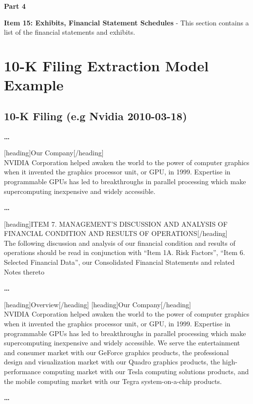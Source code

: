 \documentclass[logo,bsc,singlespacing,parskip]{infthesis}
\begin{document}
\textbf{Part 4} 

\textbf{Item 15: Exhibits, Financial Statement Schedules} - This section contains a list of the financial statements and exhibits.

\cite{sec2010k, wiki10k}
\chapter{10-K Filing Extraction Model Example}
\label{appendix_nvidia}

\section{10-K Filing (e.g Nvidia 2010-03-18)}
\label{appendix_nvidia_10-k}

\begin{center}
\textbf{…} \\
\end{center}
[heading]Our Company[/heading]\\
NVIDIA Corporation helped awaken the world to the power of computer graphics when it invented the graphics processor unit, or GPU, in 1999.  Expertise in programmable GPUs has led to breakthroughs in parallel processing which make supercomputing inexpensive and widely accessible.  
\begin{center}
\textbf{…} 
\end{center}
[heading]ITEM 7. MANAGEMENT’S DISCUSSION AND ANALYSIS OF FINANCIAL CONDITION AND RESULTS OF OPERATIONS[/heading]\\
The following discussion and analysis of our financial condition and results of operations should be read in conjunction with “Item 1A. Risk Factors”, “Item 6. Selected Financial Data”, our Consolidated Financial Statements and related Notes thereto 
\begin{center}
\textbf{…}
\end{center}
[heading]Overview[/heading] 
[heading]Our Company[/heading] \\
NVIDIA Corporation helped awaken the world to the power of computer graphics when it invented the graphics processor unit, or GPU, in 1999.  Expertise in programmable GPUs has led to breakthroughs in parallel processing which make supercomputing inexpensive and widely accessible.  We serve the entertainment and consumer market with our GeForce graphics products, the professional design and visualization market with our Quadro graphics products, the high-performance computing market with our Tesla computing solutions products, and the mobile computing market with our Tegra system-on-a-chip products. 
\begin{center}
\textbf{…}
\end{center}
\end{document}
